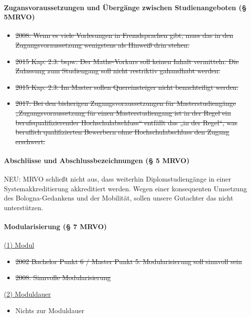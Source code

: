       \paragraph{Zugansvoraussetzungen und Übergänge zwischen Studienangeboten (§ 5MRVO)}
        \begin{itemize}
          \item \sout{2008: Wenn es viele Vorlesungen in Fremdsprachen gibt, muss das in den Zugangsvoraussetzung wenigstens als Hinweiß drin stehen.}
          \item \sout{2015 Kap. 2.3: bspw: Der Mathe-Vorkurs soll keinen Inhalt vermitteln. Die Zulassung zum Studiengang soll nicht restriktiv gahandhabt werden.}
          \item \sout{2015 Kap. 2.3: Im Master sollen Quereinsteiger nicht benachteiligt werden.}
          \item \sout{2017: Bei den bisherigen Zugangsvoraussetzungen für Masterstudiengänge „Zugangsvoraussetzung für einen Masterstudiengang ist in der Regel ein berufsqualifizierender Hochschulabschluss“ entfällt das „in der Regel“, was beruflich qualifizierten Bewerbern ohne Hochschulabschluss den Zugang erschwert.}
        \end{itemize}

      \paragraph{Abschlüsse und Abschlussbezeichnungen (§ 5 MRVO)}
        NEU: MRVO schließt nicht aus, dass weiterhin Diplomstudiengänge in einer Systemakkreditierung akkreditiert werden.
        Wegen einer konsequenten Umsetzung des Bologna-Gedankens und der Mobilität, sollen unsere Gutachter das nicht unterstützen.


      \paragraph{Modularisierung (§ 7 MRVO)}
        \underline{(1) Modul}
          \begin{itemize}
            \item \sout{2002 Bachelor Punkt 6 / Master Punkt 5: Modularisierung soll sinnvoll sein}
            \item \sout{2008: Sinnvolle Modularisierung}
          \end{itemize}

        \underline{(2) Moduldauer}
          \begin{itemize}
            \item Nichts zur Moduldauer
          \end{itemize}

